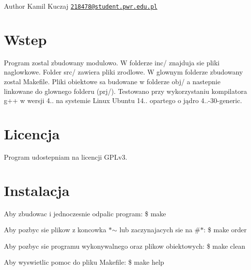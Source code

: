 \begin{DoxyAuthor}{Author}
Kamil Kuczaj \href{mailto:218478@student.pwr.edu.pl}{\tt 218478@student.\-pwr.\-edu.\-pl}
\end{DoxyAuthor}
\hypertarget{index_intro_sec}{}\section{Wstep}\label{index_intro_sec}
Program zostal zbudowany modulowo. W folderze inc/ znajduja sie pliki naglowkowe. Folder src/ zawiera pliki zrodlowe. W glownym folderze zbudowany zostal Makefile. Pliki obiektowe sa budowane w folderze obj/ a nastepnie linkowane do glownego folderu (prj/). Testowano przy wykorzystaniu kompilatora g++ w wersji 4.. na systemie Linux Ubuntu 14.. opartego o jądro 4..-\/30-\/generic.\hypertarget{index_Licencja}{}\section{Licencja}\label{index_Licencja}
Program udostepniam na licencji G\-P\-Lv3.\hypertarget{index_install_sec}{}\section{Instalacja}\label{index_install_sec}
Aby zbudowac i jednoczesnie odpalic program\-: \$ make

Aby pozbyc sie plikow z koncowka $\ast$$\sim$ lub zaczynajacych sie na \#$\ast$\-: \$ make order

Aby pozbyc sie programu wykonywalnego oraz plikow obiektowych\-: \$ make clean

Aby wyswietlic pomoc do pliku Makefile\-: \$ make help 